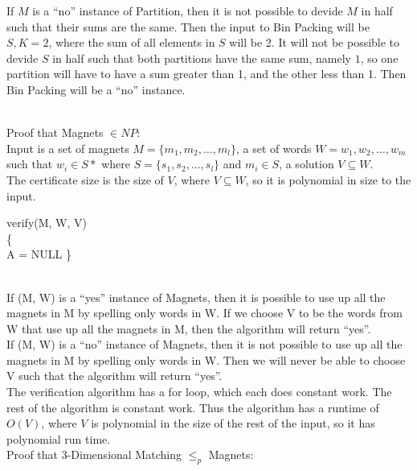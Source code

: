 \documentclass{assignment}
\begin{document}
\begin{problemlist}
\begin{answer}
If $M$ is a ``no'' instance of Partition, then it is not possible to devide $M$ in half such that their sums are the same. Then the input to Bin Packing will be $S, K=2$, where the sum of all elements in $S$ will be 2. It will not be possible to devide $S$ in half such that both partitions have the same sum, namely $1$, so one partition will have to have a sum greater than 1, and the other less than 1. Then Bin Packing will be a ``no'' instance.\\
\end{answer}
\clearpage
\pbitem
\begin{problem}
\end{problem}
\begin{answer}
\\
Proof that Magnets $\in NP$:\\
Input is a set of magnets $M=\{m_1,m_2,\ldots,m_l\}$, a set of words $W=w_1,w_2,\ldots,w_m$ such that $w_i \in S*$ where $S=\{s_1,s_2,\ldots,s_l\}$ and $m_i\in S$, a solution $V\subseteq W$.\\
The certificate size is the size of $V$, where $V\subseteq W$, so it is polynomial in size to the input.\\
\IncMargin{3em}
\begin{algorithm}
  verify(M, W, V)\\\{\\
  \Indp
  A = NULL\;
  \Indm
  \}
\end{algorithm}
\DecMargin{3em}\\
If (M, W) is a ``yes'' instance of Magnets, then it is possible to use up all the magnets in M by spelling only words in W. If we choose V to be the words from W that use up all the magnets in M, then the algorithm will return ``yes''.\\
If (M, W) is a ``no'' instance of Magnets, then it is not possible to use up all the magnets in M by spelling only words in W. Then we will never be able to choose V such that the algorithm will return ``yes''.\\
The verification algorithm has a for loop, which each does constant work. The rest of the algorithm is constant work. Thus the algorithm has a runtime of $O(V)$, where $V$ is polynomial in the size of the rest of the input, so it has polynomial run time.\\
\clearpage
Proof that 3-Dimensional Matching $\le_p$ Magnets:\\

\end{answer}
\end{problemlist}
\end{document}
